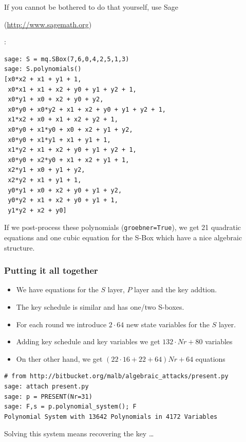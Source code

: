 \documentclass[9pt]{beamer}
\begin{document}
\begin{frame}
\framebreak

If you cannot be bothered to do that yourself, use Sage \begin{small}(\url{http://www.sagemath.org})\end{small}:

\begin{lstlisting}
sage: S = mq.SBox(7,6,0,4,2,5,1,3)
sage: S.polynomials()
[x0*x2 + x1 + y1 + 1, 
 x0*x1 + x1 + x2 + y0 + y1 + y2 + 1, 
 x0*y1 + x0 + x2 + y0 + y2, 
 x0*y0 + x0*y2 + x1 + x2 + y0 + y1 + y2 + 1, 
 x1*x2 + x0 + x1 + x2 + y2 + 1, 
 x0*y0 + x1*y0 + x0 + x2 + y1 + y2, 
 x0*y0 + x1*y1 + x1 + y1 + 1,
 x1*y2 + x1 + x2 + y0 + y1 + y2 + 1,
 x0*y0 + x2*y0 + x1 + x2 + y1 + 1,
 x2*y1 + x0 + y1 + y2,
 x2*y2 + x1 + y1 + 1,
 y0*y1 + x0 + x2 + y0 + y1 + y2,
 y0*y2 + x1 + x2 + y0 + y1 + 1,
 y1*y2 + x2 + y0]
\end{lstlisting}

If we post-process these polynomials (\lstinline{groebner=True}), we get 21 quadratic equations and one cubic equation for the S-Box which have a nice algebraic structure.

\end{frame}

\begin{frame}[fragile]
\frametitle{Putting it all together} 

\begin{itemize}
 \item We have equations for the $S$ layer, $P$ layer and the key addtion.
 \item The key schedule is similar and has one/two S-boxes. 
 \item For each round we introduce $2 \cdot 64$ new state variables for the $S$ layer.
 \item Adding key schedule and key variables we get $132 \cdot Nr +80$ variables
 \item On ther other hand, we get $(22 ⋅ 16 + 22 + 64)Nr + 64$ equations
\end{itemize}

\begin{lstlisting}
# from http://bitbucket.org/malb/algebraic_attacks/present.py
sage: attach present.py
sage: p = PRESENT(Nr=31)
sage: F,s = p.polynomial_system(); F
Polynomial System with 13642 Polynomials in 4172 Variables
\end{lstlisting}

\begin{block}{}
Solving this system means recovering the key \dots
\end{block}
\end{frame}
\end{document}
